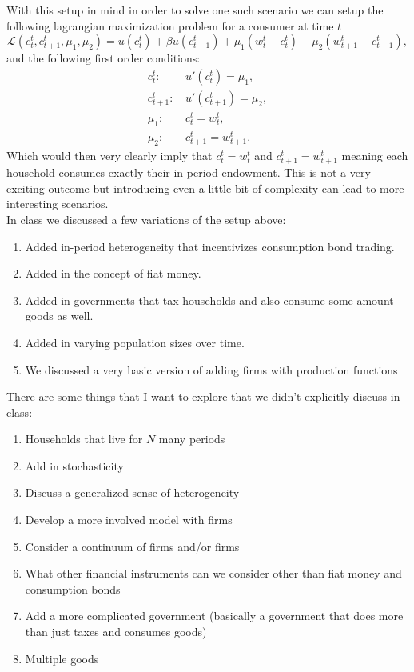 \documentclass[11pt,english]{article}
\begin{document}
\noindent With this setup in mind in order to solve one such scenario we can setup the following lagrangian maximization problem for a consumer at time $t$ $$\mathcal{L}(c_t^t, c_{t+1}^t, \mu_1, \mu_2) = u\left(c_t^t\right) + \beta u\left(c_{t+1}^t\right) + \mu_1\left(w_t^t - c_t^t\right) + \mu_2\left(w_{t+1}^t - c_{t+1}^t\right),$$ and the following first order conditions:
\begin{align*}
	c_t^t:\,& u'\left(c_t^t\right) = \mu_1,\\
	c_{t+1}^t:\,& u'\left(c_{t+1}^t\right) = \mu_2,\\
	\mu_1:\,& c_t^t = w_t^t,\\
	\mu_2:\,& c_{t+1}^t = w_{t+1}^t.
\end{align*} Which would then very clearly imply that $c_t^t = w_t^t$ and $c_{t+1}^t = w_{t+1}^t$ meaning each household consumes exactly their in period endowment. This is not a very exciting outcome but introducing even a little bit of complexity can lead to more interesting scenarios.\\

\noindent In class we discussed a few variations of the setup above:\begin{enumerate}
	\item Added in-period heterogeneity that incentivizes consumption bond trading.

	\item Added in the concept of fiat money.

	\item Added in governments that tax households and also consume some amount goods as well.

	\item Added in varying population sizes over time.

	\item We discussed a very basic version of adding firms with production functions
\end{enumerate} There are some things that I want to explore that we didn't explicitly discuss in class:
\begin{enumerate}
	\item Households that live for $N$ many periods

	\item  Add in stochasticity

	\item Discuss a generalized sense of heterogeneity

	\item Develop a more involved model with firms

	\item Consider a continuum of firms and/or firms

	\item What other financial instruments can we consider other than fiat money and consumption bonds

	\item Add a more complicated government (basically a government that does more than just taxes and consumes goods)

	\item Multiple goods
\end{enumerate}
\end{document}
